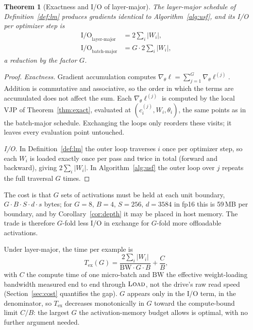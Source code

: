 \documentclass[preprint,12pt]{elsarticle}
\newtheorem{theorem}{Theorem}
\begin{document}
\begin{theorem}[Exactness and I/O of layer-major]
\label{thm:lm}
The layer-major schedule of Definition~\ref{def:lm} produces gradients identical to Algorithm~\ref{alg:usf}, and its
I/O per optimizer step is
\begin{align}
\mathrm{I/O}_{\text{layer-major}} &= 2\sum_i |W_i| , \\
\mathrm{I/O}_{\text{batch-major}} &= G \cdot 2\sum_i |W_i| ,
\end{align}
a reduction by the factor $G$.
\end{theorem}

\begin{proof}
\emph{Exactness.} Gradient accumulation computes
$\nabla_\theta \ell = \sum_{j=1}^{G} \nabla_\theta \ell^{(j)}$. Addition is commutative and
associative, so the order in which the terms are accumulated does not affect the sum. Each
$\nabla_\theta \ell^{(j)}$ is computed by the local VJP of Theorem~\ref{thm:exact}, evaluated at
$(c_i^{(j)}, W_i, \theta_i)$, the same points as in the batch-major schedule. Exchanging the loops
only reorders these visits; it leaves every evaluation point untouched.

\emph{I/O.} In Definition~\ref{def:lm} the outer loop traverses $i$ once per optimizer step, so each $W_i$ is
loaded exactly once per pass and twice in total (forward and backward), giving $2\sum_i |W_i|$. In
Algorithm~\ref{alg:usf} the outer loop over $j$ repeats the full traversal $G$ times.
\end{proof}

The cost is that $G$ sets of activations must be held at each unit boundary,
$G \cdot B \cdot S \cdot d \cdot s$ bytes; for $G=8$, $B=4$, $S=256$, $d=3584$ in fp16 this is
59\,MB per boundary, and by Corollary~\ref{cor:depth} it may be placed in host memory. The trade is
therefore $G$-fold less I/O in exchange for $G$-fold more offloadable activations.

Under layer-major, the time per example is
\begin{equation}
\label{eq:choiceG}
T_{\text{ex}}(G) = \frac{2\sum_i |W_i|}{\mathrm{BW}\cdot G\cdot B} + \frac{C}{B},
\end{equation}
with $C$ the compute time of one micro-batch and $\mathrm{BW}$ the effective weight-loading
bandwidth measured end to end through $\textsc{Load}$, not the drive's raw read speed
(Section~\ref{sec:cost} quantifies the gap). $G$ appears only in the I/O term, in the denominator, so
$T_{\text{ex}}$ decreases monotonically in $G$ toward the compute-bound limit $C/B$: the largest $G$
the activation-memory budget allows is optimal, with no further argument needed.
\end{document}
